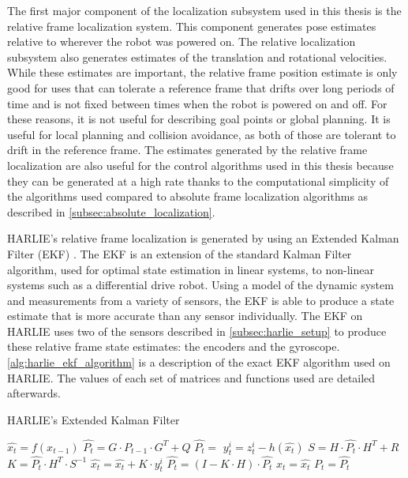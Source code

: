 The first major component of the localization subsystem used in this thesis is the relative frame localization system. This component generates pose estimates relative to wherever the robot was powered on. The relative localization subsystem also generates estimates of the translation and rotational velocities. While these estimates are important, the relative frame position estimate is only good for uses that can tolerate a reference frame that drifts over long periods of time and is not fixed between times when the robot is powered on and off. For these reasons, it is not useful for describing goal points or global planning. It is useful for local planning and collision avoidance, as both of those are tolerant to drift in the reference frame. The estimates generated by the relative frame localization are also useful for the control algorithms used in this thesis because they can be generated at a high rate thanks to the computational simplicity of the algorithms used compared to absolute frame localization algorithms as described in \autoref{subsec:absolute_localization}.

HARLIE's relative frame localization is generated by using an Extended Kalman Filter (EKF) \autocites{Larsen1999}{Welch95anintroduction}{ProbRobotics}. The EKF is an extension of the standard Kalman Filter algorithm, used for optimal state estimation in linear systems, to non-linear systems such as a differential drive robot. Using a model of the dynamic system and measurements from a variety of sensors, the EKF is able to produce a state estimate that is more accurate than any sensor individually. The EKF on HARLIE uses two of the sensors described in \autoref{subsec:harlie_setup} to produce these relative frame state estimates: the encoders and the gyroscope. \autoref{alg:harlie_ekf_algorithm} is a description of the exact EKF algorithm used on HARLIE. The values of each set of matrices and functions used are detailed afterwards.

\begin{algorithm}
\caption{HARLIE's Extended Kalman Filter}
\label{alg:harlie_ekf_algorithm}
\DontPrintSemicolon
{}


$\hat{x_t} = f(x_{t-1})$\;
$\hat{P_t} = G \cdot P_{t-1} \cdot G^T + Q$\;
$\hat{P_t} = $ \;
{
	$y^i_t = z^i_t - h(\hat{x_t})$\;
	$S = H \cdot \hat{P_t} \cdot H^T + R$\;
	$K = \hat{P_t} \cdot H^T \cdot S^{-1}$\;
	$\hat{x_t} = \hat{x_t} + K \cdot y^i_t$\;
	$\hat{P_t} = \left(I - K \cdot H \right) \cdot \hat{P_t}$\;
}
$x_t = \hat{x_t}$\;
$P_t = \hat{P_t}$\;
\end{algorithm}

